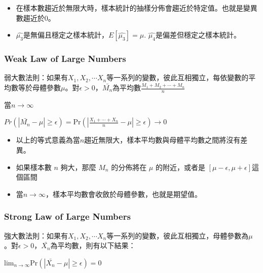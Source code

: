 \documentclass[hyperref,]{ctexart}
\providecommand{\tightlist}{%
  \setlength{\itemsep}{0pt}\setlength{\parskip}{0pt}}
\begin{document}
\begin{itemize}
\item
  在樣本數趨近於無限大時，樣本統計的抽樣分佈會趨近於特定值。也就是變異數趨近於0。
\item
  \(\hat{\mu_{3}}\)是無偏且穩定之樣本統計，\(E[\hat{\mu_{3}}]=\mu\).
  \(\hat{\mu_{4}}\)是偏差但穩定之樣本統計。
\end{itemize}

\hypertarget{weak-law-of-large-numbers}{%
\subsubsection{Weak Law of Large
Numbers}\label{weak-law-of-large-numbers}}

弱大數法則：如果有\(X_{1}, X_{2},\cdots X_{n}\)等一系列的變數，彼此互相獨立，每依變數的平均數等於母體參數\(\mu\)。對\(\epsilon>0\)，\(\bar{M_{n}}\)為平均數\(\frac{M_{1}+M_{2}+\cdots +M_{n}}{n}\)

當\(n\rightarrow \infty\)

\begin{center}
$Pr(|\bar{M_{n}}-\mu|\geq \epsilon)=\text{Pr}(|\frac{X_{1}+\cdots +X_{n}}{n}-\mu|\geq \epsilon)\rightarrow 0$
\end{center}

\begin{itemize}
\tightlist
\item
  以上的等式意義為當\(n\)趨近無限大，樣本平均數與母體平均數之間將沒有差異。
\item
  如果樣本數 \(n\) 夠大，那麼 \(M_{n}\) 的分佈將在 \(\mu\)
  的附近，或者是 \([\mu-\epsilon,\mu+\epsilon]\)這個區間
\item
  當\(n\rightarrow \infty\)，樣本平均數會收斂於母體參數，也就是期望值。
\end{itemize}

\hypertarget{strong-law-of-large-numbers}{%
\subsubsection{Strong Law of Large
Numbers}\label{strong-law-of-large-numbers}}

強大數法則：如果有\(X_{1}, X_{2},\cdots X_{n}\)等一系列的變數，彼此互相獨立，母體參數為\(\mu\)。對\(\epsilon>0\)，\(\bar{X_{n}}\)為平均數，則有以下結果：

\begin{center}
${\mathrm {lim}}_{n\rightarrow \infty}\text{Pr}(|\bar{X_{n}}-\mu|\geq \epsilon)=0$
\end{center}
\end{document}
